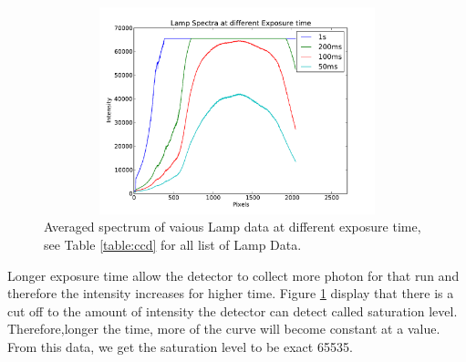 \documentclass[a4paper,12pt]{article}
\begin{document}
\begin{figure}[H]
\centering
\includegraphics[angle=0,height=6cm,width=12cm]{graphs/Saturation.pdf}
\caption{Averaged spectrum of vaious Lamp data at different exposure time, see Table \ref{table:ccd} for all list of Lamp Data.}
\label{fig:Saturation}
\end{figure}
Longer exposure time allow the detector to collect more photon for that run and therefore the intensity increases for higher time. Figure \ref{fig:Saturation} display that there is a cut off to the amount of intensity the detector can detect called saturation level. Therefore,longer the time, more of the curve will become constant at a value. From this data, we get the saturation level to be exact 65535.
\end{document}
